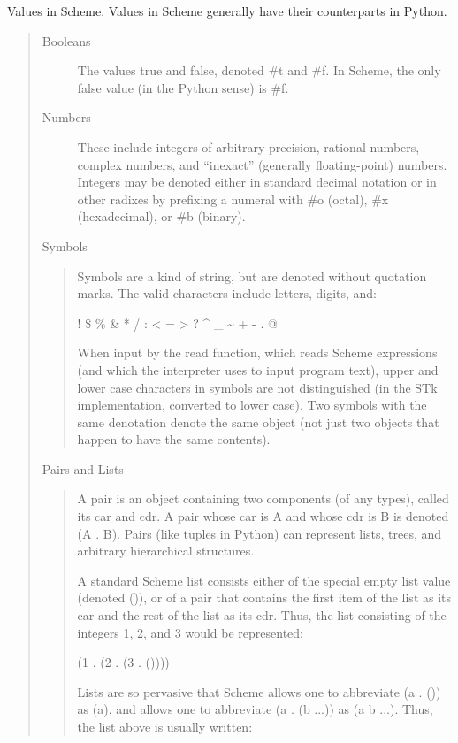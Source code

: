 \documentclass[letterpaper,10pt,dvipdfmx]{sphinxmanual}
\begin{document}
Values in Scheme. Values in Scheme generally have their counterparts in Python.
\begin{quote}
\begin{description}
\item[{Booleans}] \leavevmode
The values true and false, denoted \#t and \#f. In Scheme, the only false value (in the Python sense) is \#f.

\item[{Numbers}] \leavevmode
These include integers of arbitrary precision, rational numbers, complex numbers, and ``inexact'' (generally floating-point) numbers. Integers may be denoted either in standard decimal notation or in other radixes by prefixing a numeral with \#o (octal), \#x (hexadecimal), or \#b (binary).

\end{description}

Symbols
\begin{quote}

Symbols are a kind of string, but are denoted without quotation marks. The valid characters include letters, digits, and:

!  \$  \%  \&  *  /  :  \textless{}  = \textgreater{}  ?  \textasciicircum{}  \_  \textasciitilde{}  +  -  .  @

When input by the read function, which reads Scheme expressions (and which the interpreter uses to input program text), upper and lower case characters in symbols are not distinguished (in the STk implementation, converted to lower case). Two symbols with the same denotation denote the same object (not just two objects that happen to have the same contents).
\end{quote}

Pairs and Lists
\begin{quote}

A pair is an object containing two components (of any types), called its car and cdr. A pair whose car is A and whose cdr is B is denoted (A . B). Pairs (like tuples in Python) can represent lists, trees, and arbitrary hierarchical structures.

A standard Scheme list consists either of the special empty list value (denoted ()), or of a pair that contains the first item of the list as its car and the rest of the list as its cdr. Thus, the list consisting of the integers 1, 2, and 3 would be represented:

(1 . (2 . (3 . ())))

Lists are so pervasive that Scheme allows one to abbreviate (a . ()) as (a), and allows one to abbreviate (a . (b ...)) as (a b ...). Thus, the list above is usually written:


\end{quote}
\end{quote}
\end{document}
